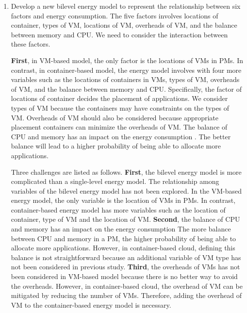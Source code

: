 \begin{enumerate}
	\item Develop a new bilevel energy model to represent the relationship between six factors and energy consumption. The five factors involves locations of container, types of VM, locations of VM, overheads of VM, and the balance between memory and CPU. We need to consider the interaction between these factors.

	\textbf{First}, in VM-based model, the only factor is the locations of VMs in PMs. In contrast, in container-based model,  the energy model involves with four more variables such as the locations of containers in VMs, types of VM, overheads of VM, and the balance between memory and CPU. Specifically, the factor of locations of container decides the placement of applications. We consider types of VM because the containers may have constraints on the types of VM. Overheads of VM should also be considered because appropriate placement containers can minimize the overheads of VM. The balance of CPU and memory has an impact on the energy consumption \cite{Mishra:2011bz}. The better balance will lead to a higher probability of being able to allocate more applications.

	Three challenges are listed as follows. \textbf{First}, the bilevel energy model is more complicated than a single-level energy model. The relationship among variables of the bilevel energy model has not been explored. In the VM-based energy model, the only variable is the location of VMs in PMs. In contrast,  container-based energy model has more variables such as the location of container, type of VM and the location of VM. \textbf{Second}, the balance of CPU and memory has an impact on the energy consumption  The more balance between CPU and memory in a PM, the higher probability of being able to allocate more applications. However, in container-based cloud, defining this balance is not straightforward because an additional variable of VM type has not been considered in previous study. \textbf{Third}, the overheads of VMs has not been considered in VM-based model because there is no better way to avoid the overheads. However, in container-based cloud, the overhead of VM can be mitigated by reducing the number of VMs. Therefore, adding the overhead of VM to the container-based energy model is necessary. 


\end{enumerate}
